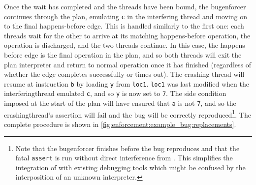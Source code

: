 Once the wait has completed and the threads have been bound, the
\gls{bugenforcer} continues through the plan, emulating \texttt{c} in
the interfering thread and moving on to the final happens-before edge.
This is handled similarly to the first one: each threads wait for the
other to arrive at its matching happens-before operation, the
operation is discharged, and the two threads continue.  In this case,
the happens-before edge is the final operation in the plan, and so
both threads will exit the plan interpreter and return to normal
operation once it has finished (regardless of whether the edge
completes successfully or times out).  The crashing thread will resume
at instruction {\tt b} by loading \texttt{y} from \texttt{loc1}.
\texttt{loc1} was last modified when the \gls{interferingthread}
emulated \texttt{c}, and so \texttt{y} is now set to \texttt{7}.  The
side condition imposed at the start of the plan will have ensured that
\texttt{a} is not \texttt{7}, and so the \gls{crashingthread}'s
assertion will fail and the bug will be correctly
reproduced\footnote{Note that the \protect\gls{bugenforcer} finishes
  before the bug reproduces and that the fatal \texttt{assert} is run
  without direct interference from {\technique}.  This simplifies the
  integration of {\technique} with existing debugging tools which
  might be confused by the interposition of an unknown interpreter.}.
The complete procedure is shown in
\autoref{fig:enforcement:example_bug:replacements}.

